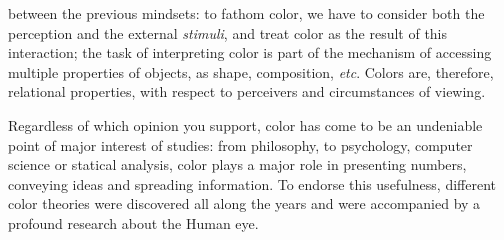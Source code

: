 between the previous mindsets: to fathom color, we have to consider both the perception and the external
\emph{stimuli}, and treat color as the result of this interaction; the task of interpreting color is part of
the mechanism of accessing multiple properties of objects, as shape, composition, \emph{etc}.
Colors are, therefore, relational properties, with respect to perceivers and circumstances of viewing. \par
Regardless of which opinion you support, color has come to be an undeniable point of major interest of studies:
from philosophy, to psychology, computer science or statical analysis, color plays a major role in presenting
numbers, conveying ideas and spreading information. To endorse this usefulness, different color theories were
discovered all along the years and were accompanied by a profound research about the Human eye.
%
